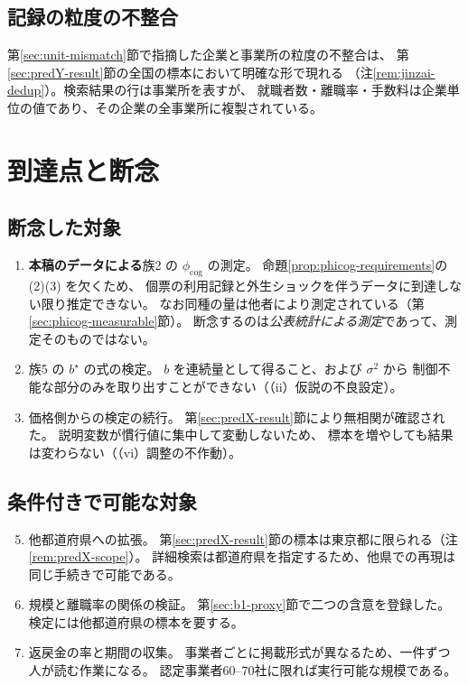 \subsection{記録の粒度の不整合}

第\ref{sec:unit-mismatch}節で指摘した企業と事業所の粒度の不整合は、
第\ref{sec:predY-result}節の全国の標本において明確な形で現れる
（注\ref{rem:jinzai-dedup}）。検索結果の行は事業所を表すが、
就職者数・離職率・手数料は企業単位の値であり、その企業の全事業所に複製されている。


\section{到達点と断念}

\subsection{断念した対象}

\begin{enumerate}[label=(\arabic*)]
\item \textbf{本稿のデータによる}族2 の $\phi_{\mathrm{cog}}$ の測定。
命題\ref{prop:phicog-requirements}の (2)(3) を欠くため、
個票の利用記録と外生ショックを伴うデータに到達しない限り推定できない。
なお同種の量は他者により測定されている（第\ref{sec:phicog-measurable}節）。
断念するのは\emph{公表統計による測定}であって、測定そのものではない。

\item 族5 の $b^\star$ の式の検定。
$b$ を連続量として得ること、および $\sigma^2$ から
制御不能な部分のみを取り出すことができない（（ii）仮説の不良設定）。

\item 価格側からの検定の続行。
第\ref{sec:predX-result}節により無相関が確認された。
説明変数が慣行値に集中して変動しないため、
標本を増やしても結果は変わらない（（vi）調整の不作動）。

\end{enumerate}

\subsection{条件付きで可能な対象}

\begin{enumerate}[label=(\arabic*)]
\setcounter{enumi}{4}
\item 他都道府県への拡張。
第\ref{sec:predX-result}節の標本は東京都に限られる（注\ref{rem:predX-scope}）。
詳細検索は都道府県を指定するため、他県での再現は同じ手続きで可能である。

\item 規模と離職率の関係の検証。
第\ref{sec:b1-proxy}節で二つの含意を登録した。
検定には他都道府県の標本を要する。

\item 返戻金の率と期間の収集。
事業者ごとに掲載形式が異なるため、一件ずつ人が読む作業になる。
認定事業者60--70社に限れば実行可能な規模である。
\end{enumerate}

